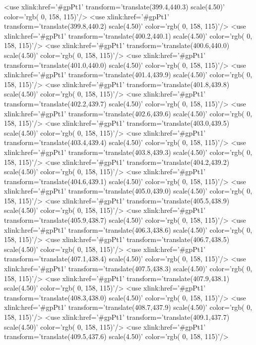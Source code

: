	<use xlink:href='#gpPt1' transform='translate(399.4,440.3) scale(4.50)' color='rgb(  0, 158, 115)'/>
	<use xlink:href='#gpPt1' transform='translate(399.8,440.2) scale(4.50)' color='rgb(  0, 158, 115)'/>
	<use xlink:href='#gpPt1' transform='translate(400.2,440.1) scale(4.50)' color='rgb(  0, 158, 115)'/>
	<use xlink:href='#gpPt1' transform='translate(400.6,440.0) scale(4.50)' color='rgb(  0, 158, 115)'/>
	<use xlink:href='#gpPt1' transform='translate(401.0,440.0) scale(4.50)' color='rgb(  0, 158, 115)'/>
	<use xlink:href='#gpPt1' transform='translate(401.4,439.9) scale(4.50)' color='rgb(  0, 158, 115)'/>
	<use xlink:href='#gpPt1' transform='translate(401.8,439.8) scale(4.50)' color='rgb(  0, 158, 115)'/>
	<use xlink:href='#gpPt1' transform='translate(402.2,439.7) scale(4.50)' color='rgb(  0, 158, 115)'/>
	<use xlink:href='#gpPt1' transform='translate(402.6,439.6) scale(4.50)' color='rgb(  0, 158, 115)'/>
	<use xlink:href='#gpPt1' transform='translate(403.0,439.5) scale(4.50)' color='rgb(  0, 158, 115)'/>
	<use xlink:href='#gpPt1' transform='translate(403.4,439.4) scale(4.50)' color='rgb(  0, 158, 115)'/>
	<use xlink:href='#gpPt1' transform='translate(403.8,439.3) scale(4.50)' color='rgb(  0, 158, 115)'/>
	<use xlink:href='#gpPt1' transform='translate(404.2,439.2) scale(4.50)' color='rgb(  0, 158, 115)'/>
	<use xlink:href='#gpPt1' transform='translate(404.6,439.1) scale(4.50)' color='rgb(  0, 158, 115)'/>
	<use xlink:href='#gpPt1' transform='translate(405.0,439.0) scale(4.50)' color='rgb(  0, 158, 115)'/>
	<use xlink:href='#gpPt1' transform='translate(405.5,438.9) scale(4.50)' color='rgb(  0, 158, 115)'/>
	<use xlink:href='#gpPt1' transform='translate(405.9,438.7) scale(4.50)' color='rgb(  0, 158, 115)'/>
	<use xlink:href='#gpPt1' transform='translate(406.3,438.6) scale(4.50)' color='rgb(  0, 158, 115)'/>
	<use xlink:href='#gpPt1' transform='translate(406.7,438.5) scale(4.50)' color='rgb(  0, 158, 115)'/>
	<use xlink:href='#gpPt1' transform='translate(407.1,438.4) scale(4.50)' color='rgb(  0, 158, 115)'/>
	<use xlink:href='#gpPt1' transform='translate(407.5,438.3) scale(4.50)' color='rgb(  0, 158, 115)'/>
	<use xlink:href='#gpPt1' transform='translate(407.9,438.1) scale(4.50)' color='rgb(  0, 158, 115)'/>
	<use xlink:href='#gpPt1' transform='translate(408.3,438.0) scale(4.50)' color='rgb(  0, 158, 115)'/>
	<use xlink:href='#gpPt1' transform='translate(408.7,437.9) scale(4.50)' color='rgb(  0, 158, 115)'/>
	<use xlink:href='#gpPt1' transform='translate(409.1,437.7) scale(4.50)' color='rgb(  0, 158, 115)'/>
	<use xlink:href='#gpPt1' transform='translate(409.5,437.6) scale(4.50)' color='rgb(  0, 158, 115)'/>
